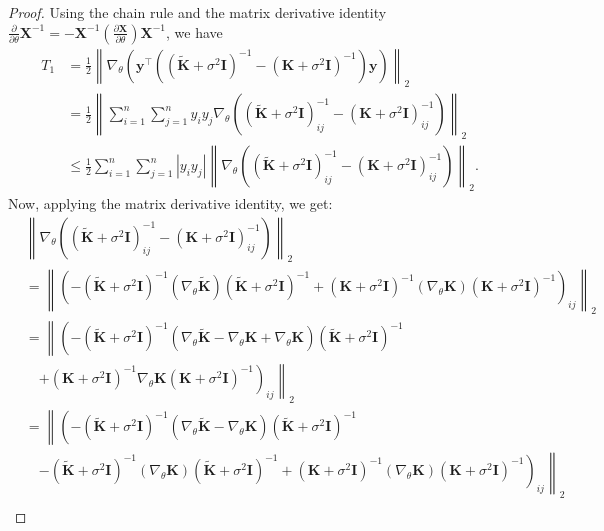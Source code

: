 \begin{proof}
Using the chain rule and the matrix derivative identity $\frac{\partial}{\partial \theta} \mathbf{X}^{-1} = -\mathbf{X}^{-1} (\frac{\partial \mathbf{X}}{\partial \theta}) \mathbf{X}^{-1}$, we have
\begin{align*}
    T_1 &= \frac{1}{2} \left\| \nabla_\theta \left( \mathbf{y}^\top \left( (\tilde{\mathbf{K}} + \sigma^2 \mathbf{I})^{-1} - (\mathbf{K} + \sigma^2 \mathbf{I})^{-1} \right) \mathbf{y} \right) \right\|_2 \\
    &= \frac{1}{2} \left\| \sum_{i=1}^n \sum_{j=1}^n y_i y_j \nabla_\theta \left( (\tilde{\mathbf{K}} + \sigma^2 \mathbf{I})^{-1}_{ij} - (\mathbf{K} + \sigma^2 \mathbf{I})^{-1}_{ij} \right) \right\|_2 \\
    &\leq \frac{1}{2} \sum_{i=1}^n \sum_{j=1}^n |y_i y_j| \left\| \nabla_\theta \left( (\tilde{\mathbf{K}} + \sigma^2 \mathbf{I})^{-1}_{ij} - (\mathbf{K} + \sigma^2 \mathbf{I})^{-1}_{ij} \right) \right\|_2.
\end{align*}
Now, applying the matrix derivative identity, we get:
\begin{align*}
    &\left\| \nabla_\theta \left( (\tilde{\mathbf{K}} + \sigma^2 \mathbf{I})^{-1}_{ij} - (\mathbf{K} + \sigma^2 \mathbf{I})^{-1}_{ij} \right) \right\|_2 \\
    &= \left\| \left( -(\tilde{\mathbf{K}} + \sigma^2 \mathbf{I})^{-1} (\nabla_\theta \tilde{\mathbf{K}}) (\tilde{\mathbf{K}} + \sigma^2 \mathbf{I})^{-1} + (\mathbf{K} + \sigma^2 \mathbf{I})^{-1} (\nabla_\theta \mathbf{K}) (\mathbf{K} + \sigma^2 \mathbf{I})^{-1} \right)_{ij} \right\|_2 \\
    &= \left\| \left( -(\tilde{\mathbf{K}} + \sigma^2 \mathbf{I})^{-1} (\nabla_\theta \tilde{\mathbf{K}} - \nabla_\theta \mathbf{K} + \nabla_\theta \mathbf{K}) (\tilde{\mathbf{K}} + \sigma^2 \mathbf{I})^{-1} \right.\right.\\
    &\quad \left.\left. + (\mathbf{K} + \sigma^2 \mathbf{I})^{-1} \nabla_\theta \mathbf{K} (\mathbf{K} + \sigma^2 \mathbf{I})^{-1} \right)_{ij} \right\|_2 \\
    &= \left\| \left( -(\tilde{\mathbf{K}} + \sigma^2 \mathbf{I})^{-1} (\nabla_\theta \tilde{\mathbf{K}} - \nabla_\theta \mathbf{K}) (\tilde{\mathbf{K}} + \sigma^2 \mathbf{I})^{-1} \right.\right.\\
    &\quad \left.\left. - (\tilde{\mathbf{K}} + \sigma^2 \mathbf{I})^{-1} (\nabla_\theta \mathbf{K}) (\tilde{\mathbf{K}} + \sigma^2 \mathbf{I})^{-1}  + (\mathbf{K} + \sigma^2 \mathbf{I})^{-1} (\nabla_\theta \mathbf{K}) (\mathbf{K} + \sigma^2 \mathbf{I})^{-1} \right)_{ij} \right\|_2 \\

\end{align*}
\end{proof}
